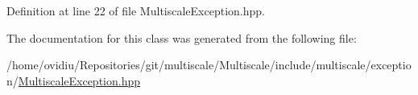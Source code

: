\-Definition at line 22 of file \-Multiscale\-Exception.\-hpp.



\-The documentation for this class was generated from the following file\-:\begin{DoxyCompactItemize}
\item 
/home/ovidiu/\-Repositories/git/multiscale/\-Multiscale/include/multiscale/exception/\hyperlink{MultiscaleException_8hpp}{\-Multiscale\-Exception.\-hpp}\end{DoxyCompactItemize}
